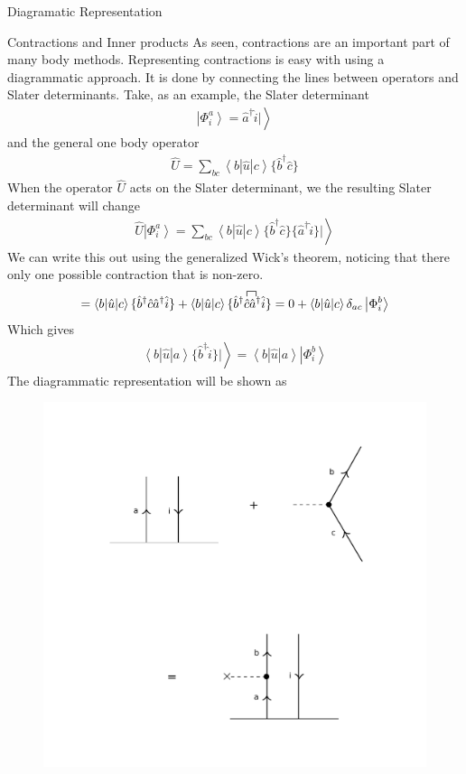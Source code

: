 \documentclass[twoside,english]{uiofysmaster}
\begin{document}
\begin{chapter}{Diagramatic Representation}
	\begin{section}{Contractions and Inner products}
		As seen, contractions are an important part of many body methods. Representing contractions is easy with using a diagrammatic approach. It is done by connecting the lines between operators and Slater determinants. Take, as an example, the Slater determinant \cite{Audun,ShavittAndBartlett}
		\begin{align}
			\left| \Phi_i^a \right> = \hat a^\dagger \hat i | \left. \right> 
		\end{align}
		and the general one body operator 
		\begin{align}
			\hat U = \sum_{bc} \left< b | \hat u | c \right> \{ \hat b^\dagger \hat c \}
		\end{align}
		When the operator $\hat U$ acts on the Slater determinant, we the resulting Slater determinant will change 
		\begin{align}
			\hat U \left| \Phi_i^a \right> = \sum_{bc} \left< b | \hat u | c \right> \{ \hat b^\dagger \hat c \} \{ \hat a^\dagger \hat i \} | \left. \right>
		\end{align}
		We can write this out using the generalized Wick's theorem, noticing that there only one possible contraction that is non-zero. 
		\begin{align}
			= \left< b | \hat u | c \right> \{ \hat b^\dagger \hat c \hat a^\dagger \hat i \} + \left< b | \hat u | c \right> \{ \hat b^\dagger \contraction{}{\hat c}{}{\hat a^\dagger}
			\hat c \hat a^\dagger \hat i \} = 0 + \left< b | \hat u | c \right> \delta_{ac} \left| \Phi_i^b \right>
		\end{align}
		Which gives
		\begin{align}
			\left< b | \hat u | a \right> \{ \hat b^\dagger \hat i \} | \left. \right> = \left< b | \hat u | a \right> \left| \Phi_i^b \right>
		\end{align}
		The diagrammatic representation will be shown as
		\begin{figure}[H]
			\includegraphics[width=\textwidth]{Figures/Contraction.pdf}

\end{figure}
\end{section}
\end{chapter}
\end{document}
